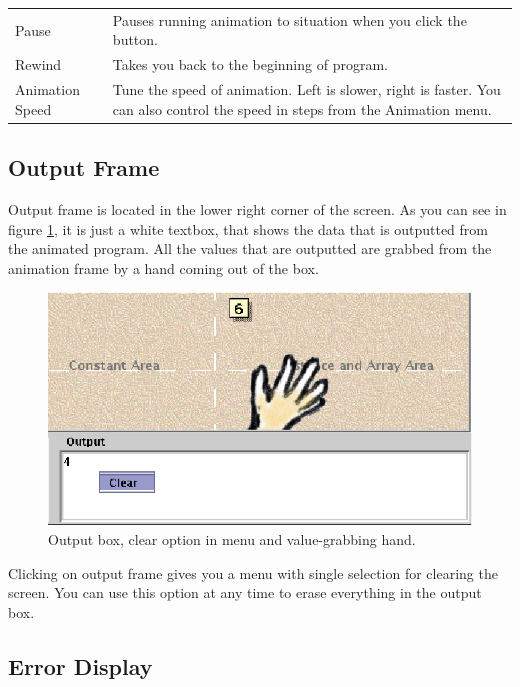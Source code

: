 \documentclass[a4paper,11pt,english]{article}
\newcommand{\bu}[1]{\textsf{#1}}
\newcommand{\menu}{\bu}
\begin{document}
{\begin{table}[h]
\begin{center}
\begin{tabular}{l|p{100mm}}
\bu{Pause} & Pauses running animation to situation when you click the button. \\

\bu{Rewind} & Takes you back to the beginning of program. \\

\bu{Animation Speed} & Tune the speed of animation. Left is slower, right is faster. You can also control the speed in steps from the \menu{Animation} menu. \\
\hline
\end{tabular}
\end{center}
\end{table}

\subsection{Output Frame}

Output frame is located in the lower right corner of the screen. As you can see in figure \ref{fig:output}, it is just a white textbox, that shows the data that is outputted from the animated program. All the values that are outputted are grabbed from the animation frame by a hand coming out of the box.

\begin{figure}[ht]
\begin{center}
\includegraphics{images/output.eps}
\caption{\label{fig:output}Output box, clear option in menu and value-grabbing hand.}
\end{center}
\end{figure}

Clicking on output frame gives you a menu with single selection for clearing the screen. You can use this option at any time to erase everything in the output box.

\subsection{Error Display}

}
\end{document}
